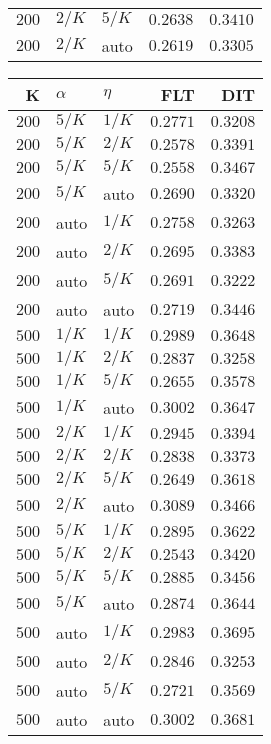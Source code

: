 \begin{table}
\begin{spacing}{1.2}
{\begin{tabular}{rll|rr}
$200$ &  $2/K$ &  $5/K$ &         $0.2638$ & $0.3410$ \\
$200$ &  $2/K$ &   auto &         $0.2619$ & $0.3305$ \\
\bottomrule
\end{tabular}
} \hfill \parbox{.45\linewidth}{\centering \begin{tabular}{rll|rr}
\toprule
    K &  $\alpha$ &    $\eta$ & FLT &        DIT \\
\midrule
$200$ &  $5/K$ &  $1/K$ &         $0.2771$ &      $0.3208$ \\
$200$ &  $5/K$ &  $2/K$ &         $0.2578$ &      $0.3391$ \\
$200$ &  $5/K$ &  $5/K$ &         $0.2558$ &      $0.3467$ \\
$200$ &  $5/K$ &   auto &         $0.2690$ &      $0.3320$ \\
$200$ &   auto &  $1/K$ &         $0.2758$ &      $0.3263$ \\
$200$ &   auto &  $2/K$ &         $0.2695$ &      $0.3383$ \\
$200$ &   auto &  $5/K$ &         $0.2691$ &      $0.3222$ \\
$200$ &   auto &   auto &         $0.2719$ &      $0.3446$ \\
$500$ &  $1/K$ &  $1/K$ &         $0.2989$ &      $0.3648$ \\
$500$ &  $1/K$ &  $2/K$ &         $0.2837$ &      $0.3258$ \\
$500$ &  $1/K$ &  $5/K$ &         $0.2655$ &      $0.3578$ \\
$500$ &  $1/K$ &   auto &         $0.3002$ &      $0.3647$ \\
$500$ &  $2/K$ &  $1/K$ &         $0.2945$ &      $0.3394$ \\
$500$ &  $2/K$ &  $2/K$ &         $0.2838$ &      $0.3373$ \\
$500$ &  $2/K$ &  $5/K$ &         $0.2649$ &      $0.3618$ \\
$500$ &  $2/K$ &   auto &    $\bm{0.3089}$ &      $0.3466$ \\
$500$ &  $5/K$ &  $1/K$ &         $0.2895$ &      $0.3622$ \\
$500$ &  $5/K$ &  $2/K$ &         $0.2543$ &      $0.3420$ \\
$500$ &  $5/K$ &  $5/K$ &         $0.2885$ &      $0.3456$ \\
$500$ &  $5/K$ &   auto &         $0.2874$ &      $0.3644$ \\
$500$ &   auto &  $1/K$ &         $0.2983$ & $\bm{0.3695}$ \\
$500$ &   auto &  $2/K$ &         $0.2846$ &      $0.3253$ \\
$500$ &   auto &  $5/K$ &         $0.2721$ &      $0.3569$ \\
$500$ &   auto &   auto &         $0.3002$ &      $0.3681$ \\
\bottomrule
\end{tabular}
}
\end{spacing}
\end{table}
